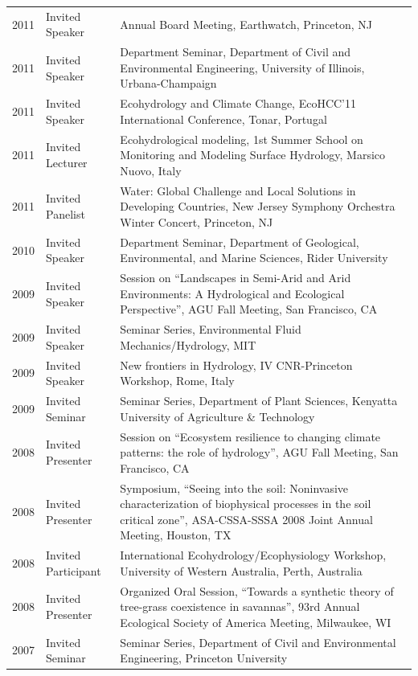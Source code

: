 \begin{longtable}{l p{3.0cm} p{11.5cm}}
2011 & Invited Speaker & Annual Board Meeting, Earthwatch, Princeton, NJ \\
2011 & Invited Speaker & Department Seminar, Department of Civil and Environmental Engineering, University of Illinois, Urbana-Champaign \\
2011 & Invited Speaker & Ecohydrology and Climate Change, EcoHCC'11 International Conference, Tonar, Portugal \\
2011 & Invited Lecturer & Ecohydrological modeling, 1st Summer School on Monitoring and Modeling Surface Hydrology, Marsico Nuovo, Italy \\
2011 & Invited Panelist & Water: Global Challenge and Local Solutions in Developing Countries, New Jersey Symphony Orchestra Winter Concert, Princeton, NJ \\
2010 & Invited Speaker & Department Seminar, Department of Geological, Environmental, and Marine Sciences, Rider University \\
2009 & Invited Speaker & Session on ``Landscapes in Semi-Arid and Arid Environments: A Hydrological and Ecological Perspective'', AGU Fall Meeting, San Francisco, CA \\
2009 & Invited Speaker & Seminar Series, Environmental Fluid Mechanics/Hydrology, MIT  \\
2009 & Invited Speaker & New frontiers in Hydrology, IV CNR-Princeton Workshop, Rome, Italy \\
2009 & Invited Seminar & Seminar Series, Department of Plant Sciences, Kenyatta University of Agriculture \& Technology \\
2008 & Invited Presenter & Session on ``Ecosystem resilience to changing climate patterns: the role of hydrology'', AGU Fall Meeting, San Francisco, CA \\
2008 & Invited Presenter & Symposium, ``Seeing into the soil: Noninvasive characterization of biophysical processes in the soil critical zone'', ASA-CSSA-SSSA 2008 Joint Annual Meeting, Houston, TX \\
2008 & Invited Participant & International Ecohydrology/Ecophysiology Workshop, University of Western Australia, Perth, Australia \\
2008 & Invited Presenter & Organized Oral Session, ``Towards a synthetic theory of tree-grass coexistence in savannas'', 93rd Annual Ecological Society of America Meeting, Milwaukee, WI \\
2007 & Invited Seminar & Seminar Series, Department of Civil and Environmental Engineering, Princeton University \\

\end{longtable}
